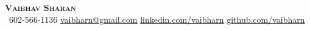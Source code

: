 \begin{center}
    \textbf{\Huge \scshape Vaibhav Sharan} \\ \vspace{1pt}
     \ \small 602-566-1136 \quad
    \href{mailto:vaibharn@gmail.com}{ \underline{vaibharn@gmail.com}} \quad
    \href{https://www.linkedin.com/in/vaibharn}{ \underline{linkedin.com/vaibharn}} \quad
    \href{https://www.github.com/vaibharn}{ \underline{github.com/vaibharn}} \quad
\end{center}